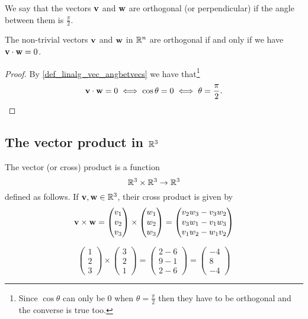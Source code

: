 \documentclass[10pt, a4paper]{article}
\begin{document}
We say that the vectors $\mathbf{v}$ and $\mathbf{w}$ are orthogonal (or perpendicular) if the angle between them is $\frac{\pi}{2}$. \\

\begin{corollary}
    The non-trivial vectors $\mathbf{v}$ and $\mathbf{w}$ in $\mathbb{R} ^ n$ are orthogonal if and only if we have $\mathbf{v \cdot w} = 0$.

    \begin{proof}
        By \autoref{def_linalg_vec_angbetvecs} we have that\footnote{Since $\cos\theta$ can only be $0$ when $\theta = \frac{\pi}{2}$ then they have to be orthogonal and the converse is true too.}
        \[
        \mathbf{v \cdot w} = 0 \iff \cos\theta = 0 \iff \theta = \frac{\pi}{2}.
        \]
    \end{proof}
\end{corollary}

\subsection{The vector product in $\mathbb{R} ^ 3$}
\begin{definition}
    The vector (or cross) product is a function
    \[
    \mathbb{R} ^ 3 \times \mathbb{R} ^ 3 \rightarrow \mathbb{R} ^ 3
    \]
    defined as follows. If $\mathbf{v, w} \in \mathbb{R} ^ 3$, their cross product is given by
    \[
    \mathbf{v \times w} =
    \begin{pmatrix} v_1 \\ v_2 \\ v_3 \end{pmatrix}
    \times
    \begin{pmatrix} w_1 \\ w_2 \\ w_3 \end{pmatrix}
    =
    \begin{pmatrix} v_2 w_3 - v_3 w_2 \\ v_3 w_1 - v_1 w_3 \\ v_1 w_2 - w_1 v_2 \end{pmatrix}
    \]
\end{definition}

\begin{example}
    \[
    \begin{pmatrix}
        1 \\ 2 \\ 3
    \end{pmatrix}
    \times
    \begin{pmatrix}
        3 \\ 2 \\ 1
    \end{pmatrix}
    = \begin{pmatrix}
        2 - 6 \\
        9 - 1 \\
        2 - 6
    \end{pmatrix}
    =
    \begin{pmatrix}
        -4 \\ 8 \\ -4
    \end{pmatrix}
    \]
\end{example}
\end{document}
